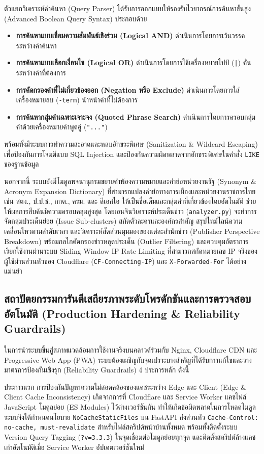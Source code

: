 ตัวแยกวิเคราะห์คำค้นหา (Query Parser) ได้รับการออกแบบให้รองรับไวยากรณ์การค้นหาขั้นสูง (Advanced Boolean Query Syntax) ประกอบด้วย
\begin{itemize}
    \item \textbf{การค้นหาแบบเชื่อมความสัมพันธ์เชิงร่วม (Logical AND)} ดำเนินการโดยการเว้นวรรคระหว่างคำค้นหา
    \item \textbf{การค้นหาแบบเลือกเงื่อนไข (Logical OR)} ดำเนินการโดยการใช้เครื่องหมายไปป์ (\texttt{|}) คั่นระหว่างคำที่ต้องการ
    \item \textbf{การคัดกรองคำที่ไม่เกี่ยวข้องออก (Negation หรือ Exclude)} ดำเนินการโดยการใส่เครื่องหมายลบ (\texttt{-term}) นำหน้าคำที่ไม่ต้องการ
    \item \textbf{การค้นหากลุ่มคำเฉพาะเจาะจง (Quoted Phrase Search)} ดำเนินการโดยการครอบกลุ่มคำด้วยเครื่องหมายคำพูดคู่ (\texttt{"..."})
\end{itemize}
พร้อมทั้งมีระบบการทำความสะอาดและหลบอักขระพิเศษ (Sanitization \& Wildcard Escaping) เพื่อป้องกันการโจมตีแบบ SQL Injection และป้องกันความผิดพลาดจากอักขระพิเศษในคำสั่ง \texttt{LIKE} ของฐานข้อมูล

นอกจากนี้ ระบบยังมีโมดูลพจนานุกรมขยายคำพ้องความหมายและคำย่อหน่วยงานรัฐ (Synonym \& Acronym Expansion Dictionary) ที่สามารถแปลงคำย่อทางการเมืองและหน่วยงานราชการไทย เช่น สตง., ป.ป.ช., กกต., ครม. และ ดีเอสไอ ให้เป็นชื่อเต็มและกลุ่มคำที่เกี่ยวข้องโดยอัตโนมัติ ช่วยให้ผลการสืบค้นมีความครอบคลุมสูงสุด โดยเอนจินวิเคราะห์ประเด็นข่าว (\texttt{analyzer.py}) จะทำการจัดกลุ่มประเด็นย่อย (Issue Sub-clusters) สกัดตัวละครและองค์กรสำคัญ สรุปไทม์ไลน์ความเคลื่อนไหวตามลำดับเวลา และวิเคราะห์สัดส่วนมุมมองของแต่ละสำนักข่าว (Publisher Perspective Breakdown) พร้อมกลไกคัดกรองข่าวหลุดประเด็น (Outlier Filtering) และควบคุมอัตราการเรียกใช้งานผ่านระบบ Sliding Window IP Rate Limiting ที่สามารถสกัดหมายเลข IP จริงของผู้ใช้ผ่านส่วนหัวของ Cloudflare (\texttt{CF-Connecting-IP}) และ \texttt{X-Forwarded-For} ได้อย่างแม่นยำ


\subsection{สถาปัตยกรรมการันตีเสถียรภาพระดับโพรดักชันและการตรวจสอบอัตโนมัติ (Production Hardening \& Reliability Guardrails)}

ในการนำระบบขึ้นสู่สภาพแวดล้อมการใช้งานจริงบนคลาวด์ร่วมกับ Nginx, Cloudflare CDN และ Progressive Web App (PWA) ระบบต้องเผชิญกับจุดเปราะบางสำคัญที่ได้รับการแก้ไขและวางมาตรการป้องกันเชิงรุก (Reliability Guardrails) 4 ประการหลัก ดังนี้

ประการแรก การป้องกันปัญหาความไม่สอดคล้องของแคชระหว่าง Edge และ Client (Edge \& Client Cache Inconsistency) เกิดจากการที่ Cloudflare และ Service Worker แคชไฟล์ JavaScript โมดูลย่อย (ES Modules) ไว้ต่างเวอร์ชันกัน ทำให้เกิดข้อผิดพลาดในการโหลดโมดูล ระบบจึงได้กำหนดนโยบาย \texttt{NoCacheStaticFiles} บน FastAPI ส่งส่วนหัว \texttt{Cache-Control: no-cache, must-revalidate} สำหรับไฟล์สคริปต์หน้าบ้านทั้งหมด พร้อมทั้งติดตั้งระบบ Version Query Tagging (\texttt{?v=3.3.3}) ในจุดเชื่อมต่อโมดูลย่อยทุกจุด และติดตั้งสคริปต์ล้างแคชเก่าอัตโนมัติเมื่อ Service Worker อัปเดตเวอร์ชันใหม่

